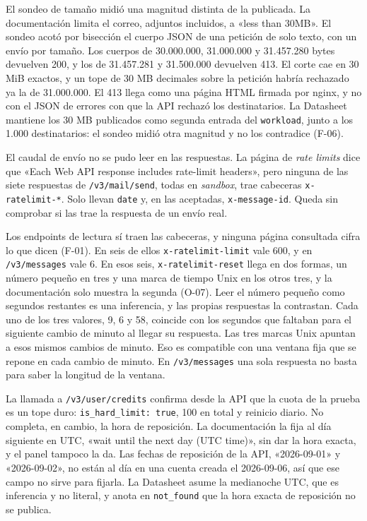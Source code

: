 El sondeo de tamaño midió una magnitud distinta de la publicada. La
documentación limita el correo, adjuntos incluidos, a «less than 30MB». El
sondeo acotó por bisección el cuerpo JSON de una petición de solo texto, con
un envío por tamaño. Los cuerpos de 30.000.000, 31.000.000 y
31.457.280 bytes devuelven 200, y los de 31.457.281 y 31.500.000 devuelven
413. El corte cae en 30 MiB exactos, y un tope de 30 MB decimales sobre la
petición habría rechazado ya la de 31.000.000. El 413 llega como una página
HTML firmada por nginx, y no con el JSON de errores con que la API rechazó los
destinatarios. La Datasheet mantiene los 30 MB publicados como segunda entrada
del \texttt{workload}, junto a los 1.000 destinatarios: el sondeo midió otra
magnitud y no los contradice (F-06).

El caudal de envío no se pudo leer en las respuestas. La página de
\textit{rate limits} dice que «Each Web API response includes rate-limit
headers», pero ninguna de las siete respuestas de \texttt{/v3/mail/send},
todas en \textit{sandbox}, trae cabeceras \texttt{x-ratelimit-*}. Solo llevan
\texttt{date} y, en las aceptadas, \texttt{x-message-id}. Queda sin comprobar
si las trae la respuesta de un envío real.

Los endpoints de lectura sí traen las cabeceras, y ninguna página consultada
cifra lo que dicen (F-01). En seis de ellos \texttt{x-ratelimit-limit} vale
600, y en \texttt{/v3/messages} vale 6. En esos seis,
\texttt{x-ratelimit-reset} llega en dos formas, un número pequeño en tres y
una marca de tiempo Unix en los otros tres, y la documentación solo muestra
la segunda (O-07). Leer el número pequeño como segundos restantes es una
inferencia, y las propias respuestas la contrastan. Cada uno de los tres
valores, 9, 6 y 58, coincide con los segundos que faltaban para el siguiente
cambio de minuto al llegar su respuesta. Las tres marcas Unix apuntan a esos
mismos cambios de minuto. Eso es compatible con una ventana fija que se
repone en cada cambio de minuto. En \texttt{/v3/messages} una sola respuesta no basta para
saber la longitud de la ventana.

La llamada a \texttt{/v3/user/credits} confirma desde la API que la cuota de
la prueba es un tope duro: \texttt{is\_hard\_limit: true}, 100 en total y
reinicio diario. No completa, en cambio, la hora de reposición. La
documentación la fija al día siguiente en UTC, «wait until the next day (UTC
time)», sin dar la hora exacta, y el panel tampoco la da. Las fechas de
reposición de la API, «2026-09-01» y «2026-09-02», no están al día en una
cuenta creada el 2026-09-06, así que ese campo no sirve para fijarla. La
Datasheet asume la medianoche UTC, que es inferencia y no literal, y anota en
\texttt{not\_found} que la hora exacta de reposición no se publica.

